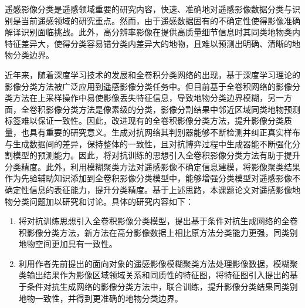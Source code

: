 

\makeatother



\begin{cabstract}
  遥感影像分类是遥感领域重要的研究内容，快速、准确地对遥感影像数据分类与识别是当前遥感领域的研究重点。然而，由于遥感数据固有的不确定性使得影像准确解译识别面临挑战。此外，高分辨率影像在提供高质量细节信息时其同类地物类内特征差异大，使得分类容易错分类内差异大的地物，且难以预测出明确、清晰的地物分类边界。

  近年来，随着深度学习技术的发展和全卷积分类网络的出现，基于深度学习理论的影像分类方法被广泛应用到遥感影像分类任务中。但目前基于全卷积网络的影像分类方法在上采样操作中易使影像丢失特征信息，导致地物分类边界模糊，另一方面，全卷积影像分类方法是像素级的分类，影像分割结果中邻近区域同类地物预测标签难以保证一致性。因此，改进现有的全卷积影像分类方法，提升影像分类质量，也具有重要的研究意义。生成对抗网络其判别器能够不断检测并纠正真实样布与生成数据间的差异，保持整体的一致性，且对抗博弈过程中生成器能不断强化分割模型的预测能力。因此，将对抗训练的思想引入全卷积影像分类方法有助于提升分类精度。此外，利用模糊聚类方法对遥感影像不确定信息建模，将影像聚类结果作为先验辅助知识添加到全卷积影像分类模型中，能够增强分类模型对遥感影像不确定性信息的表征能力，提升分类精度。基于上述思路，本课题论文对遥感影像地物分类问题加以研究和讨论。具体的研究内容如下：
  \begin{enumerate}[(1)]
    \item 将对抗训练思想引入全卷积影像分类模型，提出基于条件对抗生成网络的全卷积影像分类方法，新方法在高分影像数据上相比原方法分类能力更强，同类别地物空间更加具有一致性。
    \item 利用作者先前提出的面向对象的遥感影像模糊聚类方法处理影像数据，模糊聚类输出结果作为影像区域领域关系和同质性的特征图，将特征图引入提出的基于条件对抗生成网络的影像分类方法中，联合训练，提升影像分类结果同类别地物一致性，并得到更准确的地物分类边界。
  \end{enumerate}
\end{cabstract}

